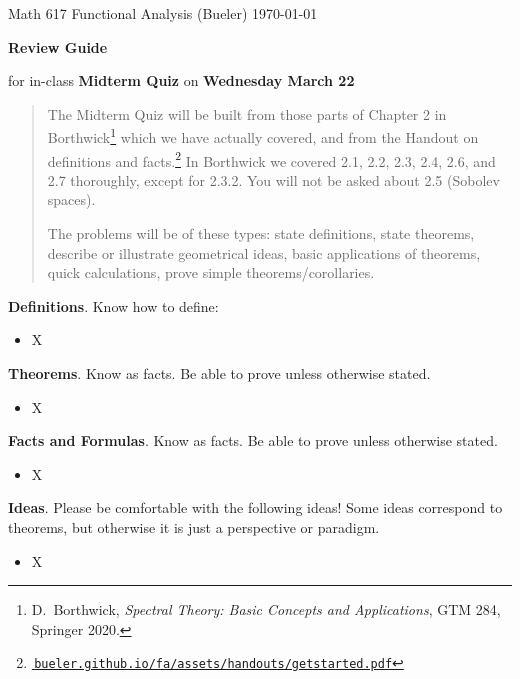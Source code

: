 \documentclass[12pt]{amsart}
\newcommand{\normalspacing}{\renewcommand{\baselinestretch}{1.1}\tiny\normalsize}
\newcommand{\bigspacing}{\renewcommand{\baselinestretch}{1.21}\tiny\normalsize}
\newcommand{\textbook}{D.~Borthwick, \emph{Spectral Theory: Basic Concepts and Applications}, GTM 284, Springer 2020}
\begin{document}
\scriptsize \noindent Math 617 Functional Analysis (Bueler) \hfill \today
\thispagestyle{empty}

\bigskip
\LARGE\centerline{\textbf{Review Guide}}

\medskip
\Large\centerline{for in-class \textbf{Midterm Quiz} on \textbf{Wednesday March 22}}

\normalsize
\bigskip
\begin{quote}
The Midterm Quiz will be built from those parts of Chapter 2 in Borthwick\footnote{\textbook.} which we have actually covered, and from the Handout on definitions and facts.\footnote{\href{https://bueler.github.io/fa/assets/handouts/getstarted.pdf}{\,\texttt{bueler.github.io/fa/assets/handouts/getstarted.pdf}}}  In Borthwick we covered 2.1, 2.2, 2.3, 2.4, 2.6, and 2.7 thoroughly, except for 2.3.2.  You will not be asked about 2.5 (Sobolev spaces).

The problems will be of these types: state definitions, state theorems, describe or illustrate geometrical ideas, basic applications of theorems, quick calculations, prove simple theorems/corollaries.
\end{quote}
\bigskip

\bigspacing
\noindent \textbf{Definitions}. Know how to define:
\begin{itemize}
\item X
\end{itemize}

\normalspacing

\noindent \textbf{Theorems}.  Know as facts.  Be able to prove unless otherwise stated.
\begin{itemize}
\item X
\end{itemize}

\normalspacing

\noindent \textbf{Facts and Formulas}.  Know as facts.  Be able to prove unless otherwise stated.
\begin{itemize}
\item X
\end{itemize}

\normalspacing

\bigskip\noindent \textbf{Ideas}.  Please be comfortable with the following ideas!  Some ideas correspond to theorems, but otherwise it is just a perspective or paradigm.

\bigspacing
\begin{itemize}
\item X
\end{itemize}
\end{document}
